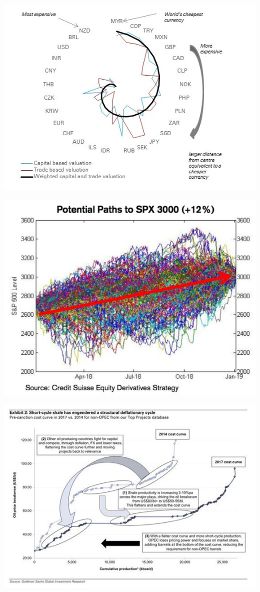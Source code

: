 \documentclass{beamer}
\begin{document}
 \begin{frame}\centering\includegraphics[width=\textwidth,keepaspectratio]{graphcrimes/DLckOPNWAAA0cy4.jpeg}\end{frame}
 \begin{frame}\centering\includegraphics[width=\textwidth,keepaspectratio]{graphcrimes/DTyVpdiV4AAnVov.jpeg}\end{frame}
 \begin{frame}\centering\includegraphics[width=\textwidth,keepaspectratio]{graphcrimes/DXfpXfmX0AAgMrS.jpeg}\end{frame}
\end{document}

